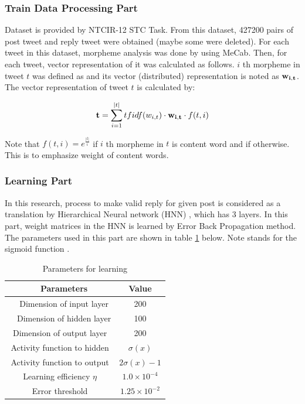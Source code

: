 \documentclass{../style/sig-alternate}
\begin{document}
\subsubsection{Train Data Processing Part}

Dataset is provided by NTCIR-12 STC Task.
From this dataset, 427200 pairs of post tweet and reply tweet were obtained (maybe some were deleted).
For each tweet in this dataset, morpheme analysis was done by using MeCab\cite{mecab}.
Then, for each tweet, vector representation of it was calculated as follows.
$ i $ th morpheme in tweet $ t $ was defined as  and its vector (distributed) representation is noted as $ {\bf w_{i,t}} $.
The vector representation of tweet $ t $ is calculated by:

\begin{eqnarray}
 {\bf t} = \sum_{i=1}^{|t|} tfidf(w_{i,t}) \cdot {\bf w_{i,t}} \cdot f(t,i)
\end{eqnarray}

Note that $ f(t,i) = e^{\frac{|l|}{i}} $ if $ i $ th morpheme in $ t $ is content word and  if otherwise.
This is to emphasize weight of content words.

\subsubsection{Learning Part}

In this research, process to make valid reply for given post is considered as a translation by Hierarchical Neural network (HNN) , which has 3 layers.
In this part, weight matrices in the HNN is learned by Error Back Propagation method\cite{bahman}.
The parameters used in this part are shown in table \ref{tab:hnn_parameters} below.
Note  stands for the sigmoid function .

\begin{table}[h!]
  \centering
  \caption{Parameters for learning}
  \label{tab:hnn_parameters}
  \begin{tabular}{|c|c|} \hline
    　{\bf Parameters} & {\bf Value} \\ \hline
    　Dimension of input layer & 200 \\ \hline
    　Dimension of hidden layer & 100 \\ \hline
    Dimension of output layer & 200 \\ \hline
    Activity function to hidden & $ \sigma ( x ) $ \\ \hline
    Activity function to output & $ 2 \sigma ( x ) - 1 $ \\ \hline
    Learning efficiency $ \eta $ & $ 1.0 \times 10^{-4} $ \\ \hline
    Error threshold & $ 1.25 \times 10^{-2} $ \\ \hline
  \end{tabular}
\end{table}
\end{document}
